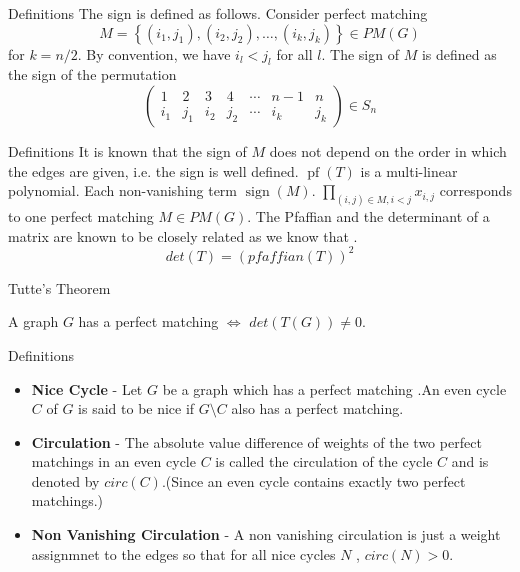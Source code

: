 \documentclass{beamer}
\begin{document}
	\begin{frame}{Definitions}
		The sign is defined as follows. Consider perfect matching
		$$
		M=\left\{\left(i_1, j_1\right),\left(i_2, j_2\right), \ldots,\left(i_k, j_k\right)\right\} \in P M(G)
		$$
		for $k=n / 2$. By convention, we have $i_l<j_l$ for all $l$. The sign of $M$ is defined as the sign of the permutation
		\begin{equation}
			\left(\begin{array}{ccccccc}
				1 & 2 & 3 & 4 & \cdots & n-1 & n \\
				i_1 & j_1 & i_2 & j_2 & \cdots & i_k & j_k
			\end{array}\right) \in S_n
		\end{equation}
	\end{frame}
	\begin{frame}{Definitions}
		It is known that the sign of $M$ does not depend on the order in which the edges are given, i.e. the sign is well defined.
		$\operatorname{pf}(T)$ is a multi-linear polynomial. Each non-vanishing term $\operatorname{sign}(M)$. $\prod_{(i,j)\in M,i<j} x_{i, j}$ corresponds to one perfect matching $M \in P M(G)$. The Pfaffian 
		and the determinant of a matrix are known to be closely related as we know that .
			$$det(T)=(pfaffian(T))^2$$
			
	\end{frame}
	\begin{frame}{Tutte's Theorem}
		\begin{theorem}
			A graph $G$ has a perfect matching $\iff$ $det(T(G)) \neq 0$.
		\end{theorem}
		
		 
		
	\end{frame}
	\begin{frame}[allowframebreaks]{Definitions}
		\begin{itemize}
			\item\textbf{Nice Cycle} - Let $G$ be a graph which has a perfect matching .An even cycle $C$ of $G$ is said to be nice if $G \setminus C$ also has a perfect matching.
			\item\textbf{Circulation} - The absolute value difference of weights of the two perfect matchings in an even cycle $C$ is called the circulation of the cycle $C$ and is denoted by $circ(C)$.(Since an even cycle contains exactly two perfect matchings.)
			\item \textbf{Non Vanishing Circulation} - A non vanishing circulation is just a weight assignmnet to the edges so that for all nice cycles $N$ , $circ(N)>0$.
			
		\end{itemize}
		
		
	\end{frame}
\end{document}
